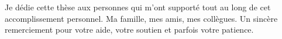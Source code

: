 \begin{dedic}

Je dédie cette thèse aux personnes qui m'ont supporté tout au long de cet accomplissement personnel. Ma famille, mes amis, mes collègues. Un sincère remerciement pour votre aide, votre soutien et parfois votre patience.

\end{dedic}
